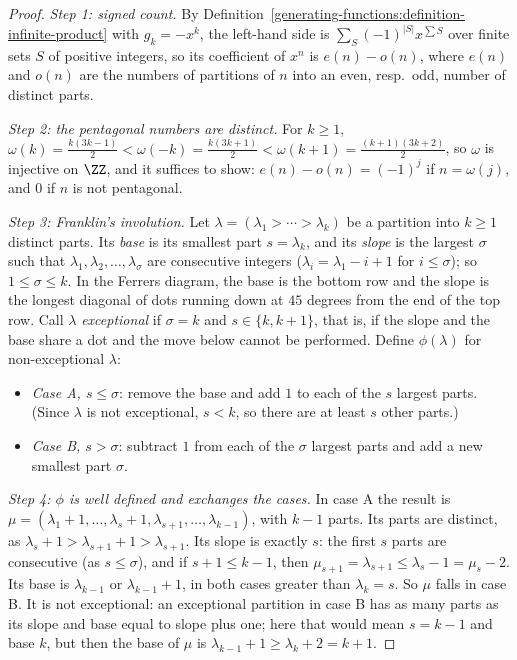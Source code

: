 \begin{proof}
\emph{Step 1: signed count.} By Definition~\ref{generating-functions:definition-infinite-product} with $g_k = -x^k$, the left-hand side is $\sum_S(-1)^{|S|}x^{\sum S}$ over finite sets $S$ of positive
integers, so its coefficient of $x^n$ is $e(n) - o(n)$, where $e(n)$ and $o(n)$ are the numbers of partitions of $n$ into an even, resp.\ odd, number of distinct parts.

\emph{Step 2: the pentagonal numbers are distinct.} For $k \geq 1$, $\omega(k) = \frac{k(3k-1)}{2} < \omega(-k) = \frac{k(3k+1)}{2} < \omega(k + 1) = \frac{(k+1)(3k+2)}{2}$, so $\omega$ is injective
on $\ZZ$, and it suffices to show: $e(n) - o(n) = (-1)^j$ if $n = \omega(j)$, and $0$ if $n$ is not pentagonal.

\emph{Step 3: Franklin's involution.} Let $\lambda = (\lambda_1 > \cdots > \lambda_k)$ be a partition into $k \geq 1$ distinct parts. Its \emph{base} is its smallest part $s = \lambda_k$, and its
\emph{slope} is the largest $\sigma$ such that $\lambda_1, \lambda_2, \ldots, \lambda_\sigma$ are consecutive integers ($\lambda_i = \lambda_1 - i + 1$ for $i \leq \sigma$); so $1 \leq \sigma \leq k$. In
the Ferrers diagram, the base is the bottom row and the slope is the longest diagonal of dots running down at $45$ degrees from the end of the top row. Call $\lambda$ \emph{exceptional} if $\sigma = k$
and $s \in \{k, k + 1\}$, that is, if the slope and the base share a dot and the move below cannot be performed. Define $\phi(\lambda)$ for non-exceptional $\lambda$:
\begin{itemize}
\item \emph{Case A, $s \leq \sigma$}: remove the base and add $1$ to each of the $s$ largest parts. (Since $\lambda$ is not exceptional, $s < k$, so there are at least $s$ other parts.)
\item \emph{Case B, $s > \sigma$}: subtract $1$ from each of the $\sigma$ largest parts and add a new smallest part $\sigma$.
\end{itemize}

\emph{Step 4: $\phi$ is well defined and exchanges the cases.} In case A the result is $\mu = (\lambda_1 + 1, \ldots, \lambda_s + 1, \lambda_{s+1}, \ldots, \lambda_{k-1})$, with $k - 1$ parts. Its
parts are distinct, as $\lambda_s + 1 > \lambda_{s+1} + 1 > \lambda_{s+1}$. Its slope is exactly $s$: the first $s$ parts are consecutive (as $s \leq \sigma$), and if $s + 1 \leq k - 1$, then
$\mu_{s+1} = \lambda_{s+1} \leq \lambda_s - 1 = \mu_s - 2$. Its base is $\lambda_{k-1}$ or $\lambda_{k-1} + 1$, in both cases greater than $\lambda_k = s$. So $\mu$ falls in case B. It is not
exceptional: an exceptional partition in case B has as many parts as its slope and base equal to slope plus one; here that would mean $s = k - 1$ and base $k$, but then the base of $\mu$ is
$\lambda_{k-1} + 1 \geq \lambda_k + 2 = k + 1$.


\end{proof}
